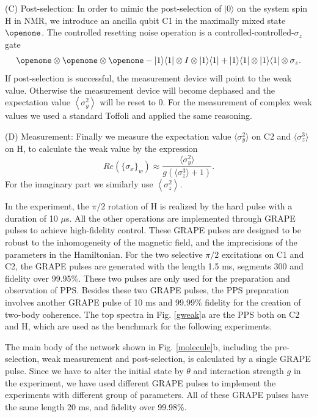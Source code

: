 \documentclass[aps,pra,12pt,onecolumn,showpacs,superscriptaddress,floatfix,footinbib,subfigure]{revtex4}
\begin{document}
 (C) Post-selection: In order to mimic the post-selection of $|0\rangle$ on the system spin H in NMR, we introduce an ancilla qubit C1 in the maximally mixed state $\openone$. The controlled resetting noise operation is  a controlled-controlled-$\sigma_z$ gate
 \begin{equation}\label{postselection}
\openone\otimes \openone \otimes \openone - |1\rangle \langle 1 | \otimes I \otimes  |1\rangle \langle 1 | + |1\rangle \langle 1 | \otimes |1\rangle \langle 1 | \otimes \sigma_z.
 \end{equation}
 If post-selection is successful, the measurement device will point to the weak value. Otherwise the measurement device will become dephased and the expectation value $\left<\sigma_y^2\right>$ will be reset to 0.  For the measurement of complex weak values we used a standard Toffoli and applied the same reasoning.

(D) Measurement: Finally we measure the expectation value $\langle \sigma_y^2 \rangle$ on C2 and $\langle \sigma_z^3 \rangle$ on H, to calculate the weak value by the expression
 \begin{equation}\label{weakvalue}
Re(\{ \sigma_x \}_w) \approx \frac{\langle \sigma_y^2 \rangle}{ g(\langle \sigma_z^3 \rangle+1)}.
 \end{equation}
For the imaginary part we similarly use $\left<\sigma_z^2\right>$.

In the experiment, the $\pi/2$ rotation of H is realized by the hard pulse with a duration of 10 $\mu$s. All the other operations are implemented through GRAPE pulses to achieve high-fidelity control. These GRAPE pulses are designed to be robust to the inhomogeneity of the magnetic field, and the imprecisions of the parameters in the Hamiltonian. For the two selective $\pi/2$ excitations on C1 and C2, the GRAPE pulses are generated with the length 1.5 ms, segments 300 and fidelity over 99.95\%. These two pulses are only used for the preparation and observation of PPS. Besides these two GRAPE pulses, the PPS preparation involves another GRAPE pulse of 10 ms and 99.99\% fidelity for the creation of two-body coherence. The top spectra in Fig. \ref{gweak}a are  the  PPS both on C2 and H, which are used as the benchmark for the following experiments.

The main body of the network shown in Fig. \ref{molecule}b, including the pre-selection, weak measurement and post-selection, is calculated by a single GRAPE pulse. Since we have to alter the initial state by $\theta$ and interaction strength $g$ in the experiment, we have used different GRAPE pulses to implement the experiments with different group of parameters. All of these GRAPE pulses have the same length 20 ms, and fidelity over 99.98\%.
\end{document}
